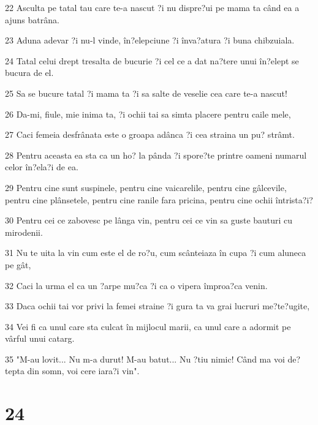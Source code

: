 \par 22 Asculta pe tatal tau care te-a nascut ?i nu dispre?ui pe mama ta când ea a ajuns batrâna.
\par 23 Aduna adevar ?i nu-l vinde, în?elepciune ?i înva?atura ?i buna chibzuiala.
\par 24 Tatal celui drept tresalta de bucurie ?i cel ce a dat na?tere unui în?elept se bucura de el.
\par 25 Sa se bucure tatal ?i mama ta ?i sa salte de veselie cea care te-a nascut!
\par 26 Da-mi, fiule, mie inima ta, ?i ochii tai sa simta placere pentru caile mele,
\par 27 Caci femeia desfrânata este o groapa adânca ?i cea straina un pu? strâmt.
\par 28 Pentru aceasta ea sta ca un ho? la pânda ?i spore?te printre oameni numarul celor în?ela?i de ea.
\par 29 Pentru cine sunt suspinele, pentru cine vaicarelile, pentru cine gâlcevile, pentru cine plânsetele, pentru cine ranile fara pricina, pentru cine ochii întrista?i?
\par 30 Pentru cei ce zabovesc pe lânga vin, pentru cei ce vin sa guste bauturi cu mirodenii.
\par 31 Nu te uita la vin cum este el de ro?u, cum scânteiaza în cupa ?i cum aluneca pe gât,
\par 32 Caci la urma el ca un ?arpe mu?ca ?i ca o vipera împroa?ca venin.
\par 33 Daca ochii tai vor privi la femei straine ?i gura ta va grai lucruri me?te?ugite,
\par 34 Vei fi ca unul care sta culcat în mijlocul marii, ca unul care a adormit pe vârful unui catarg.
\par 35 "M-au lovit... Nu m-a durut! M-au batut... Nu ?tiu nimic! Când ma voi de?tepta din somn, voi cere iara?i vin".

\chapter{24}

